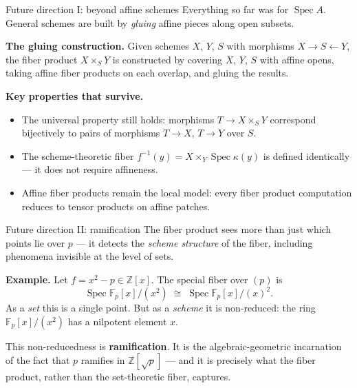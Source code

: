 \documentclass[aspectratio=169,12pt]{beamer}
\begin{document}
\iffalse  %
\begin{frame}{Future direction I: beyond affine schemes}
  Everything so far was for $\operatorname{Spec} A$.
  General schemes are built by \emph{gluing} affine pieces along open subsets.

  \medskip

  \textbf{The gluing construction.}\enspace
  Given schemes $X$, $Y$, $S$ with morphisms $X \to S \leftarrow Y$,
  the fiber product $X \times_S Y$ is constructed by covering $X$, $Y$, $S$
  with affine opens, taking affine fiber products on each overlap, and
  gluing the results.

  \medskip

  \textbf{Key properties that survive.}
  \begin{itemize}
    \item The universal property still holds: morphisms $T \to X \times_S Y$
          correspond bijectively to pairs of morphisms $T \to X$, $T \to Y$
          over $S$.
    \item The scheme-theoretic fiber $f^{-1}(y) = X \times_Y \operatorname{Spec}\kappa(y)$
          is defined identically — it does not require affineness.
    \item Affine fiber products remain the local model: every fiber product
          computation reduces to tensor products on affine patches.
  \end{itemize}
\end{frame}

\begin{frame}{Future direction II: ramification}
  The fiber product sees more than just which points lie over $p$ —
  it detects the \emph{scheme structure} of the fiber, including
  phenomena invisible at the level of sets.

  \medskip

  \textbf{Example.}\enspace
  Let $f = x^2 - p \in \mathbb{Z}[x]$.
  The special fiber over $(p)$ is
  \[
    \operatorname{Spec}\mathbb{F}_p[x]/(x^2)
    \;\cong\;
    \operatorname{Spec}\mathbb{F}_p[x]/(x)^2.
  \]
  As a \emph{set} this is a single point.
  But as a \emph{scheme} it is non-reduced: the ring $\mathbb{F}_p[x]/(x^2)$
  has a nilpotent element $x$.

  \medskip

  This non-reducedness is \textbf{ramification}.
  It is the algebraic-geometric incarnation of the fact that $p$ ramifies
  in $\mathbb{Z}[\sqrt{p}]$ — and it is precisely what the fiber product,
  rather than the set-theoretic fiber, captures.
\end{frame}
\end{document}
